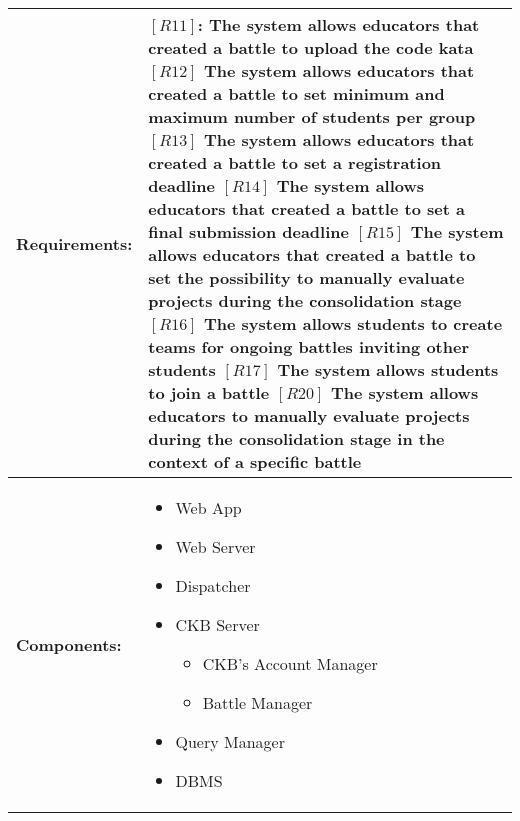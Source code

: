 \begin{table}[H]
  \centering
  \begin{tabularx}{\textwidth}{|p{3cm}|X|}
    \hline
    \textbf{Requirements:} &
    $[R11]$: The system allows educators that created a battle to upload the code kata
    \newline$[R12]$ The system allows educators that created a battle to set minimum and maximum number of students per group
    \newline$[R13]$ The system allows educators that created a battle to set a registration deadline
    \newline$[R14]$ The system allows educators that created a battle to set a final submission deadline
    \newline$[R15]$ The system allows educators that created a battle to set the possibility to manually evaluate projects during the consolidation stage
    \newline$[R16]$ The system allows students to create teams for ongoing battles inviting other students 
    \newline$[R17]$ The system allows students to join a battle
    \newline$[R20]$ The system allows educators to manually evaluate projects during the consolidation stage in the context of a specific battle 
    \\
    \hline
    \textbf{Components:} & 
    \begin{itemize}
        \item Web App
        \item Web Server 
        \item Dispatcher
        \item CKB Server 
        \begin{itemize}
            \item CKB's Account Manager
            \item Battle Manager 
        \end{itemize}
        \item Query Manager 
        \item DBMS
    \end{itemize}
    \\
    \hline
  \end{tabularx}
\end{table}


